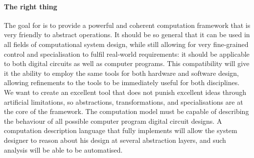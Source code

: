 \paragraph{The right thing}
The goal for {\tetra} is to provide a powerful and coherent computation framework that is very friendly to abstract operations.
It should be so general that it can be used in all fields of computational system design, while still allowing for very fine-grained control and specialisation to fulfil real-world requirements:
	it should be applicable to both digital circuits as well as computer programs.
This compatibility will give it the ability to employ the same tools for both hardware and software design, allowing refinements to the tools to be immediately useful for both disciplines.
We want to create an excellent tool that does not punish excellent ideas through artificial limitations, so abstractions, transformations, and specialisations are at the core of the framework.
The {\tetra} computation model must be capable of describing the behaviour of all possible computer program digital circuit designs.
A computation description language that fully implements {\tetra} will allow the system designer to reason about his design at several abstraction layers, and such analysis will be able to be automatised.